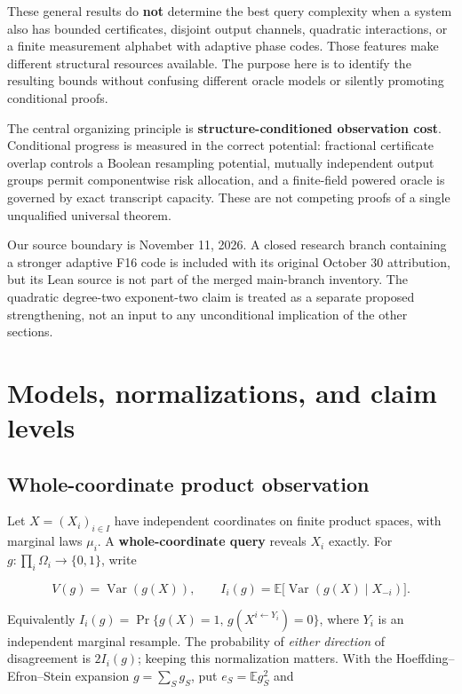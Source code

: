 \documentclass[
  10pt,
]{article}
\begin{document}
These general results do \textbf{not} determine the best query
complexity when a system also has bounded certificates, disjoint output
channels, quadratic interactions, or a finite measurement alphabet with
adaptive phase codes. Those features make different structural resources
available. The purpose here is to identify the resulting bounds without
confusing different oracle models or silently promoting conditional
proofs.

The central organizing principle is \textbf{structure-conditioned
observation cost}. Conditional progress is measured in the correct
potential: fractional certificate overlap controls a Boolean resampling
potential, mutually independent output groups permit componentwise risk
allocation, and a finite-field powered oracle is governed by exact
transcript capacity. These are not competing proofs of a single
unqualified universal theorem.

Our source boundary is November 11, 2026. A closed research branch
containing a stronger adaptive F16 code is included with its original
October 30 attribution, but its Lean source is not part of the merged
main-branch inventory. The quadratic degree-two exponent-two claim is
treated as a separate proposed strengthening, not an input to any
unconditional implication of the other sections.

\section{Models, normalizations, and claim
levels}\label{models-normalizations-and-claim-levels}

\subsection{Whole-coordinate product
observation}\label{whole-coordinate-product-observation}

Let \(X=(X_i)_{i\in I}\) have independent coordinates on finite product
spaces, with marginal laws \(\mu_i\). A \textbf{whole-coordinate query}
reveals \(X_i\) exactly. For \(g:\prod_i\Omega_i\to\{0,1\}\), write

\[
V(g)=\operatorname{Var}(g(X)),\qquad
I_i(g)=\mathbb E\big[\operatorname{Var}(g(X)\mid X_{-i})\big]. \tag{1}
\]

Equivalently \(I_i(g)=\Pr\{g(X)=1,\,g(X^{i\leftarrow Y_i})=0\}\), where
\(Y_i\) is an independent marginal resample. The probability of
\emph{either direction} of disagreement is \(2I_i(g)\); keeping this
normalization matters. With the Hoeffding--Efron--Stein expansion
\(g=\sum_S g_S\), put \(e_S=\mathbb E g_S^2\) and
\end{document}
